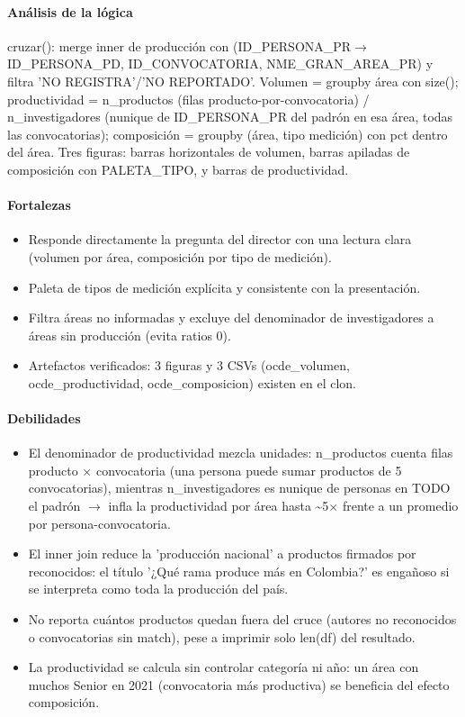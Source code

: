 \paragraph{Análisis de la lógica}
cruzar(): merge inner de producción con (ID\_PERSONA\_PR$\rightarrow$ID\_PERSONA\_PD, ID\_CONVOCATORIA, NME\_GRAN\_AREA\_PR) y filtra 'NO REGISTRA'/'NO REPORTADO'. Volumen = groupby área con size(); productividad = n\_productos (filas producto-por-convocatoria) / n\_investigadores (nunique de ID\_PERSONA\_PR del padrón en esa área, todas las convocatorias); composición = groupby (área, tipo medición) con pct dentro del área. Tres figuras: barras horizontales de volumen, barras apiladas de composición con PALETA\_TIPO, y barras de productividad.

\paragraph{Fortalezas}
\begin{itemize}
  \item Responde directamente la pregunta del director con una lectura clara (volumen por área, composición por tipo de medición).
  \item Paleta de tipos de medición explícita y consistente con la presentación.
  \item Filtra áreas no informadas y excluye del denominador de investigadores a áreas sin producción (evita ratios 0).
  \item Artefactos verificados: 3 figuras y 3 CSVs (ocde\_volumen, ocde\_productividad, ocde\_composicion) existen en el clon.
\end{itemize}

\paragraph{Debilidades}
\begin{itemize}
  \item El denominador de productividad mezcla unidades: n\_productos cuenta filas producto $\times$ convocatoria (una persona puede sumar productos de 5 convocatorias), mientras n\_investigadores es nunique de personas en TODO el padrón $\rightarrow$ infla la productividad por área hasta \textasciitilde{}5$\times$ frente a un promedio por persona-convocatoria.
  \item El inner join reduce la 'producción nacional' a productos firmados por reconocidos: el título '¿Qué rama produce más en Colombia?' es engañoso si se interpreta como toda la producción del país.
  \item No reporta cuántos productos quedan fuera del cruce (autores no reconocidos o convocatorias sin match), pese a imprimir solo len(df) del resultado.
  \item La productividad se calcula sin controlar categoría ni año: un área con muchos Senior en 2021 (convocatoria más productiva) se beneficia del efecto composición.
\end{itemize}

